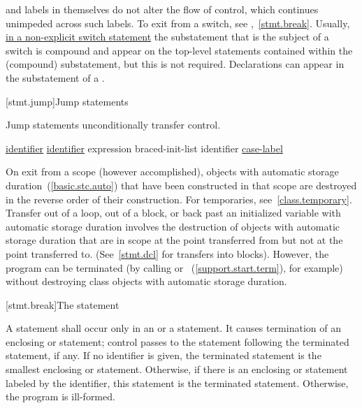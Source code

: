 \documentclass[ebook,10pt,oneside,openany,final]{memoir}
\begin{document}
\pnum
{} and  labels in themselves do not alter the
flow of control, which continues unimpeded across such labels. To exit
from a switch, see ,~\ref{stmt.break}.
\enternote
Usually, \underline{in a non-explicit switch statement} the substatement that is the subject of a switch is compound
and  appear on the top-level
statements contained within the (compound) substatement, but this is not
required.
%
Declarations can appear in the substatement of a
.
\exitnote%

[stmt.jump]{Jump statements}

\pnum
Jump statements unconditionally transfer control.

\begin{bnf}
\br
     \underline{identifier\opt} \terminal{;}\br
     \underline{identifier\opt} \terminal{;}\br
     expression\opt \terminal{;}\br
     braced-init-list \terminal{;}\br
     identifier \terminal{;}\br
     \underline{case-label} \terminal{;}\br
\end{bnf}

\pnum
On exit from a scope (however accomplished), objects with automatic storage
duration~(\ref{basic.stc.auto}) that have been constructed in that scope are destroyed
in the reverse order of their construction. \enternote For temporaries,
see~\ref{class.temporary}. \exitnote Transfer out of a loop, out of a block, or back
past an initialized variable with automatic storage duration involves the
destruction of objects with automatic storage duration that are in
scope at the point transferred from but not at the point transferred to.
(See~\ref{stmt.dcl} for transfers into blocks).
\enternote
However, the program can be terminated (by calling
%
%
 or
%
%
~(\ref{support.start.term}), for example) without destroying class objects with automatic storage duration.
\exitnote

[stmt.break]{The  statement}%

\begin{shaded}

\pnum
A  statement shall occur only in an  or a  statement.  It causes termination of an enclosing  or  statement; control passes to the statement following the terminated statement, if any.  If no identifier is given, the terminated statement is the smallest enclosing  or  statement.  Otherwise, if there is an enclosing  or  statement labeled by the identifier, this statement is the terminated statement.  Otherwise, the program is ill-formed.

\end{shaded}
\end{document}

